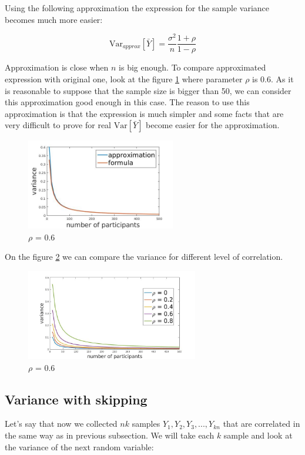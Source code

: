 \documentclass[12pt]{report}
\begin{document}
Using the following approximation the expression for the sample variance becomes much more easier:

$$\mathrm{Var}_{approx}\left[\bar{Y} \right] = \frac{\sigma^2}{n} \frac{1+\rho}{1-\rho}$$


Approximation is close when $n$ is big enough. To compare approximated expression with original one, look at the figure \ref{fig:lineGame1} where parameter $\rho$ is $0.6$. As it is reasonable to suppose that the sample size is bigger than 50, we can consider this approximation good enough in this case. The reason to use this approximation is that the expression is much simpler and some facts that are very difficult to prove for real $\mathrm{Var}\left[\bar{Y} \right]$ become easier for the approximation.

\begin{figure}[ht]
    \centering
    \includegraphics[height=150px]{lineGame1}
    \caption{ $\rho$ = 0.6 }
    \label{fig:lineGame1}
\end{figure}

On the figure \ref{fig:diffCorr} we can compare the variance for different level of correlation.


\begin{figure}[ht]
    \centering
    \includegraphics[height=150px]{varianceIndDep2}
    \caption{ $\rho$ = 0.6 }
    \label{fig:diffCorr}
\end{figure}


\subsection{Variance with skipping}

Let's say that now we collected $nk$ samples $Y_1, Y_2, Y_3, ..., Y_{kn}$ that are correlated in the same way as in previous subsection. We  will take each $k$ sample and look at the variance of the next random variable:
\end{document}
